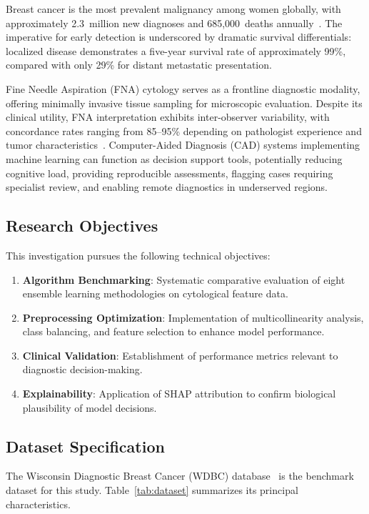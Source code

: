 \documentclass[10pt,letterpaper]{article}
\begin{document}
Breast cancer is the most prevalent malignancy among women globally, with approximately
2.3~million new diagnoses and 685,000~deaths annually~\cite{who2020}. The imperative for early
detection is underscored by dramatic survival differentials: localized disease demonstrates a
five-year survival rate of approximately 99\%, compared with only 29\% for distant metastatic
presentation.

Fine Needle Aspiration (FNA) cytology serves as a frontline diagnostic modality, offering
minimally invasive tissue sampling for microscopic evaluation. Despite its clinical utility,
FNA interpretation exhibits inter-observer variability, with concordance rates ranging from
85--95\% depending on pathologist experience and tumor characteristics~\cite{cibas2020}. Computer-Aided
Diagnosis (CAD) systems implementing machine learning can function as decision support tools,
potentially reducing cognitive load, providing reproducible assessments, flagging cases requiring
specialist review, and enabling remote diagnostics in underserved regions.

\subsection{Research Objectives}

This investigation pursues the following technical objectives:
\begin{enumerate}
    \item \textbf{Algorithm Benchmarking}: Systematic comparative evaluation of eight ensemble
    learning methodologies on cytological feature data.
    \item \textbf{Preprocessing Optimization}: Implementation of multicollinearity analysis, class
    balancing, and feature selection to enhance model performance.
    \item \textbf{Clinical Validation}: Establishment of performance metrics relevant to diagnostic
    decision-making.
    \item \textbf{Explainability}: Application of SHAP attribution to confirm biological plausibility
    of model decisions.
\end{enumerate}

\subsection{Dataset Specification}

The Wisconsin Diagnostic Breast Cancer (WDBC) database~\cite{wolberg1995} is the benchmark dataset
for this study. Table~\ref{tab:dataset} summarizes its principal characteristics.
\end{document}
